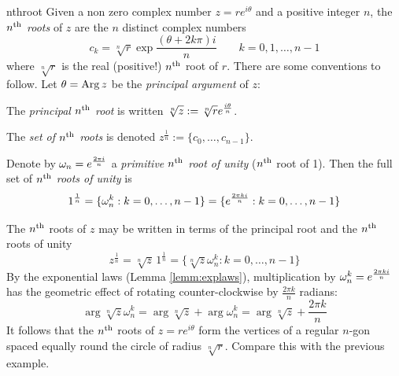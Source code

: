 \goodbreak


\begin{defn}{}{nthroot}
	Given a non zero complex number $z=re^{i\theta}$ and a positive integer $n$, the \emph{$n\textsuperscript{th}$ roots} of $z$ are the $n$ distinct complex numbers
	\[
		c_k=\sqrt[n]{r}\exp\frac{(\theta+ 2k\pi)i}n\qquad k=0,1,\ldots,n-1
	\]
	where $\sqrt[n]{r}$ is the real (positive!) $n\textsuperscript{th}$ root of $r$.\smallbreak
	There are some conventions to follow. Let $\theta=\operatorname{Arg} z$ be the \emph{principal argument} of $z$:
	\begin{enumeratea}
	  \item The \emph{principal $n\textsuperscript{th}$ root} is written $\sqrt[n]{z}:=\sqrt[n]{r}e^{\frac{i\theta}{n}}$.
	  \item The \emph{set of $n\textsuperscript{th}$ roots} is denoted $z^{\frac 1n}:=\{c_0,\ldots,c_{n-1}\}$.
	\end{enumeratea}
	Denote by $\omega_n=e^{\frac{2\pi i}{n}}$ a \emph{primitive $n\textsuperscript{th}$ root of unity} ($n\textsuperscript{th}$ root of 1). Then the full set of \emph{$n\textsuperscript{th}$ roots of unity} is
	\[
		1^{\frac 1n}=\{\omega_n^k:k=0,\ldots,n-1\}=\{e^{\frac{2\pi k i}{n}}:k=0,\ldots,n-1\}
	\]
\end{defn}


The $n\textsuperscript{th}$ roots of $z$ may be written in terms of the principal root and the $n\textsuperscript{th}$ roots of unity
\[
	z^{\frac 1n}=\sqrt[n]{z}\,1^{\frac 1n}=\{\sqrt[n]{z}\omega_n^k:k=0,\ldots,n-1\}
\]
By the exponential laws (Lemma \ref{lemm:explaws}), multiplication by $\omega_n^k=e^{\frac{2\pi ki}{n}}$ has the geometric effect of rotating counter-clockwise by $\frac{2\pi k}n$ radians:
\[
	\arg\sqrt[n]z\omega_n^k=\arg\sqrt[n]z+\arg\omega_n^k=\arg\sqrt[n]z+\frac{2\pi k}n
\]
It follows that the $n\textsuperscript{th}$ roots of $z=re^{i\theta}$ form the vertices of a regular $n$-gon spaced equally round the circle of radius $\sqrt[n]{r}$. Compare this with the previous example.


